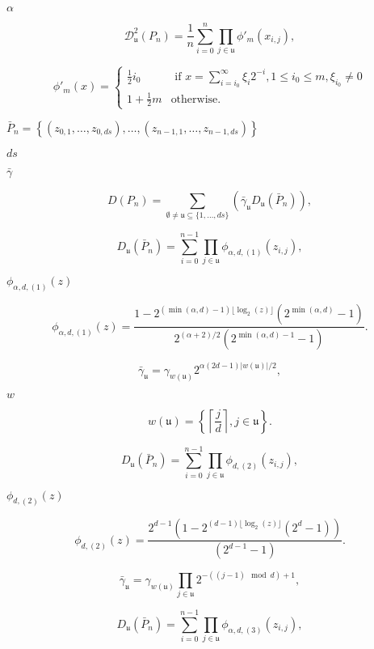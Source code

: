 \documentclass{article}
\begin{document}
$ \alpha $
\pagebreak

\[        \mathcal{D}^2_{\mathfrak u}(P_n) = \frac{1}{n} \sum_{i = 0}^n 
        \prod_{j \in \mathfrak u} \phi'_m(x_{i,j}),
\]
\pagebreak

\[        \phi'_m(x) = 
        \begin{cases}
        \frac{1}{2}i_0 & \textrm{ if } x = \sum_{i= i_0}^{\infty} \xi_i 2^{-i}, 1 \leq i_0 \leq m, \xi_{i_0} \neq 0 \\
        1 + \frac{1}{2}m & \textrm{otherwise.}
        \end{cases}
\]
\pagebreak

$\bar{P}_n = \left\{(z_{0,1}, \dots, z_{0, ds}), \dots, (z_{n-1,1}, \dots, z_{n-1, ds}) \right\}$
\pagebreak

$d s$
\pagebreak

$ \bar{\gamma} $
\pagebreak

\[    D(P_n) = \sum_{\emptyset \neq \mathfrak u \subseteq \{1, \dots, d s\}}\left(\bar{\gamma}_{\mathfrak u} D_{\mathfrak u}(\bar{P}_n)\right),
\]
\pagebreak

\[        D_{\mathfrak u}(\bar{P}_n) = \sum_{i = 0}^{n-1} \prod_{j \in \mathfrak u} \phi_{\alpha, d, (1)}(z_{i, j}),
\]
\pagebreak

$ \phi_{\alpha, d, (1)}(z) $
\pagebreak

\[        \phi_{\alpha, d, (1)}(z) =
        \frac{1 - 2^{(\min(\alpha, d) -1) \lfloor \log_2(z) \rfloor} (2^{\min(\alpha, d)} -1)}{2^{(\alpha+2)/2} (2^{\min(\alpha, d) - 1} -1) }.
\]
\pagebreak

\[        \bar{\gamma}_{\mathfrak u} = \gamma_{w(\mathfrak u)} 2^{\alpha (2d-1) |w(\mathfrak u)| / 2},
\]
\pagebreak

$w$
\pagebreak

\[        w(\mathfrak u) = \left\{ \left \lceil \frac{j}{d} \right\rceil, j \in \mathfrak u \right\}.
\]
\pagebreak

\[        D_{\mathfrak u}(\bar{P}_n) = \sum_{i = 0}^{n-1} \prod_{j \in \mathfrak u} \phi_{d, (2)}(z_{i, j}),
\]
\pagebreak

$ \phi_{d, (2)}(z) $
\pagebreak

\[    \phi_{d, (2)}(z) =
    \frac{2^{d-1}(1 - 2^{(d -1) \lfloor \log_2(z) \rfloor} (2^{d} -1))}{(2^{d - 1} -1) }.
\]
\pagebreak

\[        \bar{\gamma}_{\mathfrak u} = \gamma_{w(\mathfrak u)} \prod_{j \in \mathfrak u} 2^{- ( (j-1) \mod d) + 1},
\]
\pagebreak

\[        D_{\mathfrak u}(\bar{P}_n) = \sum_{i = 0}^{n-1} \prod_{j \in \mathfrak u} \phi_{\alpha, d, (3)}(z_{i, j}),
\]
\pagebreak
\end{document}
